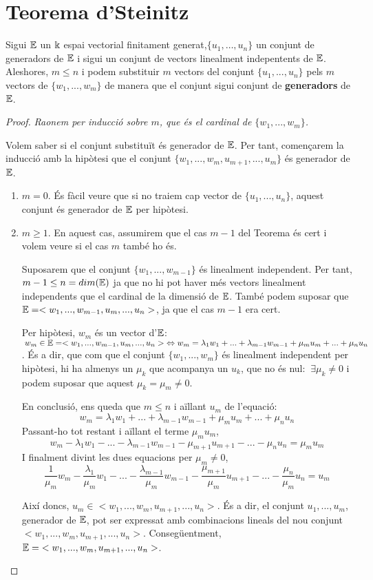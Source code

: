 \section{Teorema d'Steinitz}
Sigui $\mathbb{E}$ un $\Bbbk$ espai vectorial finitament generat,$\{u_1,\dots, u_n\}$ un conjunt de generadors de $\mathbb{E}$ i sigui un conjunt de vectors linealment indepentents de $\mathbb{E}$. Aleshores, $m \leq n$ i podem substituir $m$ vectors del conjunt $\{u_1, ..., u_n\}$ pels $m$ vectors de $\{w_1,..., w_m\}$ de manera que el conjunt sigui conjunt de \textbf{generadors} de $\mathbb{E}$.
\\

\begin{proof}
\textit{Raonem per inducció sobre $m$, que és el cardinal de $\{w_1,..., w_m\}$.}

Volem saber si el conjunt substituït és generador de $\mathbb{E}$. Per tant, començarem la inducció amb la hipòtesi que el conjunt $\{w_1,..., w_m, u_{m+1}, ..., u_m\}$ és generador de $\mathbb{E}$.
\begin{enumerate}[(1)]
\item $m = 0$.
És fàcil veure que si no traiem cap vector de $\{u_1,..., u_n\}$, aquest conjunt és generador de $\mathbb{E}$ per hipòtesi.

\item $m \geq 1$. 
En aquest cas, assumirem que el cas $m-1$ del Teorema és cert i volem veure si el cas $m$ també ho és.

Suposarem que el conjunt $\{w_1,..., w_{m-1}\}$ és linealment independent. Per tant, $m-1 \leq n = dim(\mathbb{E})$ ja que no hi pot haver més vectors linealment independents que el cardinal de la dimensió de $\mathbb{E}$. També podem suposar que $\mathbb{E} = <w_1,...,w_{m-1},u_m,...,u_n>$, ja que el cas $m-1$ era cert.

Per hipòtesi, $w_m$ és un vector d'$\mathbb{E}$: $\:w_m \in \mathbb{E} = <w_1,...,w_{m-1},u_m,...,u_n> \;\Leftrightarrow  w_m = \lambda_1 w_1 + ... + \lambda_{m-1}w_{m-1} + \mu_mu_m + ... + \mu_nu_n$. És a dir, que com que el conjunt $\{w_1,..., w_m\}$ és linealment independent per hipòtesi, hi ha almenys un $\mu_k$ que acompanya un $u_k$, que no és nul: $\:\exists\mu_k \neq 0$ i podem suposar que aquest $\mu_k = \mu_m \neq 0$.

En conclusió, ens queda que $m \leq n$ i aïllant $u_m$ de l'equació:
\[
w_m = \lambda_1w_1 + ... + \lambda_{m-1}w_{m-1} + \mu_mu_m + ... + \mu_nu_n
\]
Passant-ho tot restant i aïllant el terme $\mu_mu_m$,
\[
w_m - \lambda_1w_1 - ... - \lambda_{m-1}w_{m-1} - \mu_{m+1}u_{m+1} - ... - \mu_nu_n = \mu_mu_m
\]
I finalment divint les dues equacions per $\mu_m \neq 0$,
\[
\frac{1}{\mu_m}w_m - \frac{\lambda_1}{\mu_m}w_1 - ... - \frac{\lambda_{m-1}}{\mu_m}w_{m-1} - \frac{\mu_{m+1}}{\mu_m}u_{m+1} - ... - \frac{\mu_n}{\mu_m}u_n = u_m
\]

Així doncs, $u_m \in <w_1,...,w_m,u_{m+1},...,u_n>$. És a dir, el conjunt ${u_1,...,u_m}$, generador de $\mathbb{E}$, pot ser expressat amb combinacions lineals del nou conjunt $<w_1,...,w_m,u_{m+1},...,u_n>$. Consegüentment, $\mathbb{E} = \;<w_1,...,w_m,u_{m+1},...,u_n>$.
\end{enumerate}
\end{proof}

